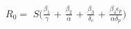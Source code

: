 \documentclass[preview]{standalone}
\begin{document}
\begin{center}
$R_0 =$ $S ($$\frac{\beta_1}{\gamma} $ + $\frac{\beta_2}{\alpha}$ + $\frac{\beta_3}{\delta_c}$ + $\frac{\beta_4 \epsilon_p}{\alpha \delta_p}$$)$
\end{center}
\end{document}
